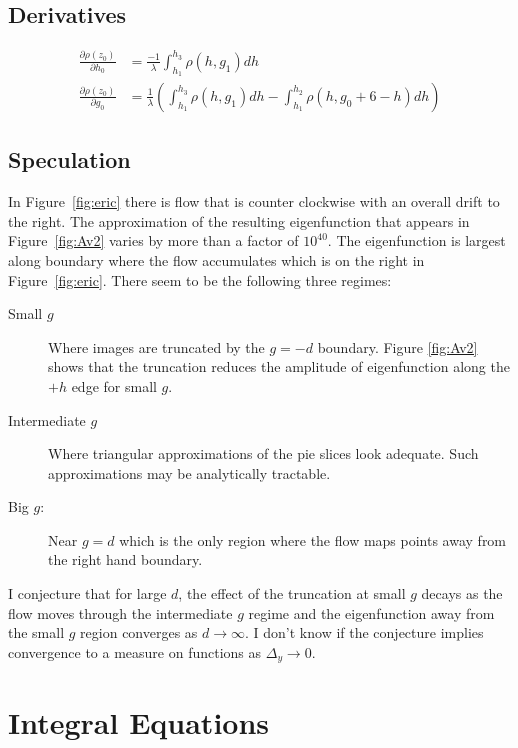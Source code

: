 \documentclass[twocolumn]{article}
\newcommand{\partialtwo}[2]{ \frac{\partial #1}{\partial
      #2}}
\begin{document}
\subsection{Derivatives}
\label{sec:derivatives}

\begin{align*}
  \partialtwo{\rho(z_0)}{h_0} &= \frac{-1}{\lambda} \int_{h_1}^{h_3}
  \rho(h, g_1) dh \\
  \partialtwo{\rho(z_0)}{g_0} &= \frac{1}{\lambda} \left(
    \int_{h_1}^{h_3} \rho(h, g_1) dh
    - \int_{h_1}^{h_2} \rho(h, g_0 + 6 -h ) dh \right)
\end{align*}
\subsection{Speculation}
\label{sec:speculation}

In Figure~\ref{fig:eric} there is flow that is counter clockwise with
an overall drift to the right.  The approximation of the resulting
eigenfunction that appears in Figure~\ref{fig:Av2} varies by more than
a factor of $10^{40}$.  The eigenfunction is largest along boundary
where the flow accumulates which is on the right in
Figure~\ref{fig:eric}.  There seem to be the following three regimes:
\begin{description}
\item[Small $g$] Where images are truncated by the $g=-d$ boundary.
  Figure \ref{fig:Av2} shows that the truncation reduces the amplitude
  of eigenfunction along the $+h$ edge for small $g$.
\item[Intermediate $g$] Where triangular approximations of the pie
  slices look adequate.  Such approximations may be analytically tractable.
\item[Big $g$:] Near $g=d$ which is the only region where the flow
  maps points away from the right hand boundary.
\end{description}
I conjecture that for large $d$, the effect of the truncation at small
$g$ decays as the flow moves through the intermediate $g$ regime and
the eigenfunction away from the small $g$ region converges as
$d\rightarrow \infty$.  I don't know if the conjecture implies
convergence to a measure on functions as $\Delta_y \rightarrow 0$.

\section{Integral Equations}
\label{sec:integral-equations}
\end{document}
